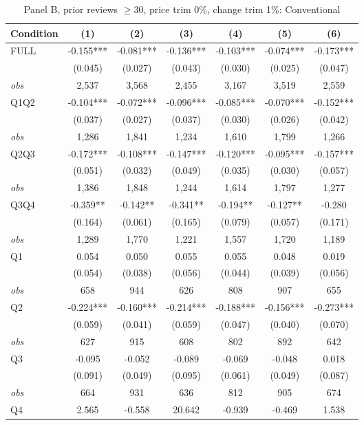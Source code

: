 \begin{table}[!htbp]
\centering
\caption{Panel B, prior reviews $\geq 30$, price trim 0\%, change trim 1\%: Conventional}
\label{tab:b:trim01:reviews30:conventional}
\small
\begin{tabular}{lcccccc}
\toprule
Condition & (1) & (2) & (3) & (4) & (5) & (6) \\
\midrule
FULL & -0.155*** & -0.081*** & -0.136*** & -0.103*** & -0.074*** & -0.173*** \\
 & (0.045) & (0.027) & (0.043) & (0.030) & (0.025) & (0.047) \\
\textit{obs} & 2,537 & 3,568 & 2,455 & 3,167 & 3,519 & 2,559 \\
Q1Q2 & -0.104*** & -0.072*** & -0.096*** & -0.085*** & -0.070*** & -0.152*** \\
 & (0.037) & (0.027) & (0.037) & (0.030) & (0.026) & (0.042) \\
\textit{obs} & 1,286 & 1,841 & 1,234 & 1,610 & 1,799 & 1,266 \\
Q2Q3 & -0.172*** & -0.108*** & -0.147*** & -0.120*** & -0.095*** & -0.157*** \\
 & (0.051) & (0.032) & (0.049) & (0.035) & (0.030) & (0.057) \\
\textit{obs} & 1,386 & 1,848 & 1,244 & 1,614 & 1,797 & 1,277 \\
Q3Q4 & -0.359** & -0.142** & -0.341** & -0.194** & -0.127** & -0.280 \\
 & (0.164) & (0.061) & (0.165) & (0.079) & (0.057) & (0.171) \\
\textit{obs} & 1,289 & 1,770 & 1,221 & 1,557 & 1,720 & 1,189 \\
Q1 & 0.054 & 0.050 & 0.055 & 0.055 & 0.048 & 0.019 \\
 & (0.054) & (0.038) & (0.056) & (0.044) & (0.039) & (0.056) \\
\textit{obs} & 658 & 944 & 626 & 808 & 907 & 655 \\
Q2 & -0.224*** & -0.160*** & -0.214*** & -0.188*** & -0.156*** & -0.273*** \\
 & (0.059) & (0.041) & (0.059) & (0.047) & (0.040) & (0.070) \\
\textit{obs} & 627 & 915 & 608 & 802 & 892 & 642 \\
Q3 & -0.095 & -0.052 & -0.089 & -0.069 & -0.048 & 0.018 \\
 & (0.091) & (0.049) & (0.095) & (0.061) & (0.049) & (0.087) \\
\textit{obs} & 664 & 931 & 636 & 812 & 905 & 674 \\
Q4 & 2.565 & -0.558 & 20.642 & -0.939 & -0.469 & 1.538 \\

\end{tabular}
\end{table}
